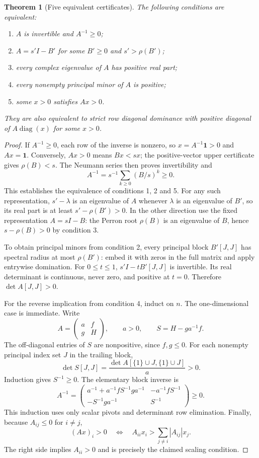 \documentclass[11pt,a4paper]{article}
\DeclareMathOperator{\diag}{diag}
\newtheorem{theorem}{Theorem}[section]
\begin{document}
\begin{theorem}[Five equivalent certificates]
The following conditions are equivalent:
\begin{enumerate}
\item $A$ is invertible and $A^{-1}\ge0$;
\item $A=s'I-B'$ for some $B'\ge0$ and $s'>\rho(B')$;
\item every complex eigenvalue of $A$ has positive real part;
\item every nonempty principal minor of $A$ is positive;
\item some $x>0$ satisfies $Ax>0$.
\end{enumerate}
They are also equivalent to strict row diagonal dominance with positive
diagonal of $A\diag(x)$ for some $x>0$.
\end{theorem}
\begin{proof}
If $A^{-1}\ge0$, each row of the inverse is nonzero, so
$x=A^{-1}\boldsymbol1>0$ and $Ax=\boldsymbol1$.
Conversely, $Ax>0$ means $Bx<sx$; the positive-vector upper certificate
gives $\rho(B)<s$. The Neumann series then proves invertibility and
\[
 A^{-1}=s^{-1}\sum_{k\ge0}(B/s)^k\ge0.
\]
This establishes the equivalence of conditions 1, 2 and 5.
For any such representation, $s'-\lambda$ is an eigenvalue of $A$
whenever $\lambda$ is an eigenvalue of $B'$, so its real part is at least
$s'-\rho(B')>0$. In the other direction use the fixed representation
$A=sI-B$: the Perron root $\rho(B)$ is an eigenvalue of $B$, hence
$s-\rho(B)>0$ by condition 3.

To obtain principal minors from condition 2, every principal block
$B'[J,J]$ has spectral radius at most $\rho(B')$: embed it with zeros in
the full matrix and apply entrywise domination. For $0\le t\le1$,
$s'I-tB'[J,J]$ is invertible. Its real determinant is continuous, never
zero, and positive at $t=0$. Therefore
$\det A[J,J]>0$.

For the reverse implication from condition 4, induct on $n$. The
one-dimensional case is immediate. Write
\[
 A=\begin{pmatrix}a&f\\g&H\end{pmatrix},\qquad a>0,
 \qquad S=H-ga^{-1}f.
\]
The off-diagonal entries of $S$ are nonpositive, since $f,g\le0$.
For each nonempty principal index set $J$ in the trailing block,
\[
 \det S[J,J]=\frac{\det A[\{1\}\cup J,\{1\}\cup J]}{a}>0.
\]
Induction gives $S^{-1}\ge0$. The elementary block inverse is
\[
 A^{-1}=\begin{pmatrix}
 a^{-1}+a^{-1}fS^{-1}ga^{-1}&-a^{-1}fS^{-1}\\
 -S^{-1}ga^{-1}&S^{-1}
 \end{pmatrix}\ge0.
\]
This induction uses only scalar pivots and determinant row elimination.
Finally, because $A_{ij}\le0$ for $i\ne j$,
\[
 (Ax)_i>0
 \quad\Longleftrightarrow\quad
 A_{ii}x_i>\sum_{j\ne i}|A_{ij}|x_j.
\]
The right side implies $A_{ii}>0$ and is precisely the claimed scaling
condition.
\end{proof}
\end{document}

